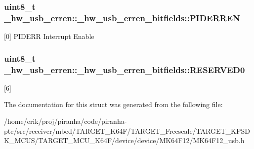 \subsubsection[{\texorpdfstring{P\+I\+D\+E\+R\+R\+EN}{PIDERREN}}]{\setlength{\rightskip}{0pt plus 5cm}uint8\+\_\+t \+\_\+hw\+\_\+usb\+\_\+erren\+::\+\_\+hw\+\_\+usb\+\_\+erren\+\_\+bitfields\+::\+P\+I\+D\+E\+R\+R\+EN}\hypertarget{struct__hw__usb__erren_1_1__hw__usb__erren__bitfields_a2162e7bb0a2c8ef61cb2343a245b3d33}{}\label{struct__hw__usb__erren_1_1__hw__usb__erren__bitfields_a2162e7bb0a2c8ef61cb2343a245b3d33}
\mbox{[}0\mbox{]} P\+I\+D\+E\+RR Interrupt Enable 
\subsubsection[{\texorpdfstring{R\+E\+S\+E\+R\+V\+E\+D0}{RESERVED0}}]{\setlength{\rightskip}{0pt plus 5cm}uint8\+\_\+t \+\_\+hw\+\_\+usb\+\_\+erren\+::\+\_\+hw\+\_\+usb\+\_\+erren\+\_\+bitfields\+::\+R\+E\+S\+E\+R\+V\+E\+D0}\hypertarget{struct__hw__usb__erren_1_1__hw__usb__erren__bitfields_ad3c314872f2a237ac0c761fd9b849023}{}\label{struct__hw__usb__erren_1_1__hw__usb__erren__bitfields_ad3c314872f2a237ac0c761fd9b849023}
\mbox{[}6\mbox{]} 

The documentation for this struct was generated from the following file\+:\begin{DoxyCompactItemize}
\item 
/home/erik/proj/piranha/code/piranha-\/ptc/src/receiver/mbed/\+T\+A\+R\+G\+E\+T\+\_\+\+K64\+F/\+T\+A\+R\+G\+E\+T\+\_\+\+Freescale/\+T\+A\+R\+G\+E\+T\+\_\+\+K\+P\+S\+D\+K\+\_\+\+M\+C\+U\+S/\+T\+A\+R\+G\+E\+T\+\_\+\+M\+C\+U\+\_\+\+K64\+F/device/device/\+M\+K64\+F12/M\+K64\+F12\+\_\+usb.\+h\end{DoxyCompactItemize}
